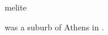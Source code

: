 \documentclass{stex}
\begin{document}
\begin{smodule}{melite}
\begin{sparagraph}[style=symdoc]
 was a suburb of Athens in .
\end{sparagraph}
\end{smodule}
\end{document}
